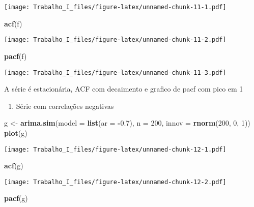 \documentclass[]{article}
\newenvironment{Shaded}{\begin{snugshade}}{\end{snugshade}}
\newcommand{\KeywordTok}[1]{\textcolor[rgb]{0.13,0.29,0.53}{\textbf{#1}}}
\newcommand{\DataTypeTok}[1]{\textcolor[rgb]{0.13,0.29,0.53}{#1}}
\newcommand{\DecValTok}[1]{\textcolor[rgb]{0.00,0.00,0.81}{#1}}
\newcommand{\FloatTok}[1]{\textcolor[rgb]{0.00,0.00,0.81}{#1}}
\newcommand{\StringTok}[1]{\textcolor[rgb]{0.31,0.60,0.02}{#1}}
\newcommand{\OperatorTok}[1]{\textcolor[rgb]{0.81,0.36,0.00}{\textbf{#1}}}
\newcommand{\NormalTok}[1]{#1}
\providecommand{\tightlist}{%
  \setlength{\itemsep}{0pt}\setlength{\parskip}{0pt}}
\begin{document}
\texttt{[image: Trabalho\_I\_files/figure-latex/unnamed-chunk-11-1.pdf]}

\begin{Shaded}
\begin{Highlighting}[]
\KeywordTok{acf}\NormalTok{(f)}
\end{Highlighting}
\end{Shaded}

\texttt{[image: Trabalho\_I\_files/figure-latex/unnamed-chunk-11-2.pdf]}

\begin{Shaded}
\begin{Highlighting}[]
\KeywordTok{pacf}\NormalTok{(f)}
\end{Highlighting}
\end{Shaded}

\texttt{[image: Trabalho\_I\_files/figure-latex/unnamed-chunk-11-3.pdf]}

A série é estacionária, ACF com decaimento e grafico de pacf com pico em
1

\begin{enumerate}
\def\labelenumi{\alph{enumi})}
\setcounter{enumi}{6}
\tightlist
\item
  Série com correlações negativas
\end{enumerate}

\begin{Shaded}
\begin{Highlighting}[]
\NormalTok{g <-}\StringTok{ }\KeywordTok{arima.sim}\NormalTok{(}\DataTypeTok{model =} \KeywordTok{list}\NormalTok{(}\DataTypeTok{ar =} \OperatorTok{-}\FloatTok{0.7}\NormalTok{), }\DataTypeTok{n =} \DecValTok{200}\NormalTok{, }\DataTypeTok{innov =} \KeywordTok{rnorm}\NormalTok{(}\DecValTok{200}\NormalTok{, }\DecValTok{0}\NormalTok{, }\DecValTok{1}\NormalTok{))}
\KeywordTok{plot}\NormalTok{(g)}
\end{Highlighting}
\end{Shaded}

\texttt{[image: Trabalho\_I\_files/figure-latex/unnamed-chunk-12-1.pdf]}

\begin{Shaded}
\begin{Highlighting}[]
\KeywordTok{acf}\NormalTok{(g)}
\end{Highlighting}
\end{Shaded}

\texttt{[image: Trabalho\_I\_files/figure-latex/unnamed-chunk-12-2.pdf]}

\begin{Shaded}
\begin{Highlighting}[]
\KeywordTok{pacf}\NormalTok{(g)}
\end{Highlighting}
\end{Shaded}
\end{document}
